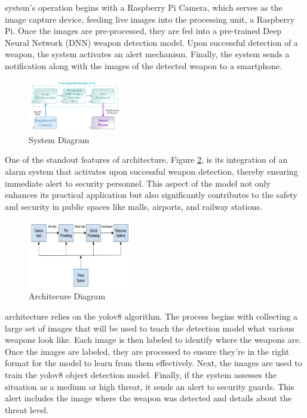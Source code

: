 \citet{rfc44} system's operation begins with a Raspberry Pi Camera, which serves as the image capture device, feeding live images into the processing unit, a Raspberry Pi. Once the images are pre-processed, they are fed into a pre-trained Deep Neural Network (DNN) weapon detection model. Upon successful detection of a weapon, the system activates an alert mechanism. Finally, the system sends a notification along with the images of the detected weapon to a smartphone.

\begin{figure}[h]
    \centering 
    \includegraphics[width=0.36\textwidth]{figs/uob-architecture.png} 
    \caption{\citet{rfc44} System Diagram}
    \label{fig:uob-architecture}
\end{figure}

One of the standout features of \citet{rfc6} architecture, Figure \ref{fig:gawade-architecture}, is its integration of an alarm system that activates upon successful weapon detection, thereby ensuring immediate alert to security personnel. This aspect of the model not only enhances its practical application but also significantly contributes to the safety and security in public spaces like malls, airports, and railway stations.
\begin{figure}[h]
    \centering 
    \includegraphics[width=0.4\textwidth]{figs/Gawade-architecture.png} 
    \caption{\citet{rfc6} Architecure Diagram}
    \label{fig:gawade-architecture}
\end{figure}

\citet{rfc17} architecture relies on the \ac{yolo}v8 algorithm. The process begins with collecting a large set of images that will be used to teach the detection model what various weapons look like. Each image is then labeled to identify where the weapons are. Once the images are labeled, they are processed to ensure they're in the right format for the model to learn from them effectively. Next, the images are used to train the \ac{yolo}v8 object detection model. Finally, if the system assesses the situation as a medium or high threat, it sends an alert to security guards. This alert includes the image where the weapon was detected and details about the threat level.

